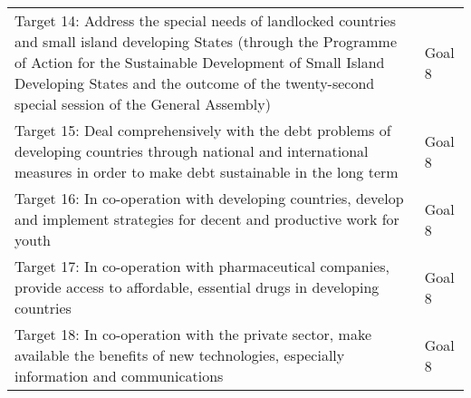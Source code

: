 \documentclass[
  openany]{book}
\begin{document}
\begin{longtable}{>{\raggedright\arraybackslash}p{33em}l}
Target 14: Address the special needs of landlocked countries and small island developing States
(through the Programme of Action for the Sustainable Development of Small Island Developing States and the outcome of the twenty-second special session of the General Assembly) & Goal 8\\
Target 15: Deal comprehensively with the debt problems of developing countries through national and international measures in order to make debt sustainable in the long term & Goal 8\\
\addlinespace
Target 16: In co-operation with developing countries, develop and implement strategies for decent and productive work for youth & Goal 8\\
Target 17: In co-operation with pharmaceutical companies, provide access to affordable, essential drugs in developing countries & Goal 8\\
Target 18: In co-operation with the private sector, make available the benefits of new technologies, especially information and communications & Goal 8\\
\bottomrule
\end{longtable}
\end{document}
